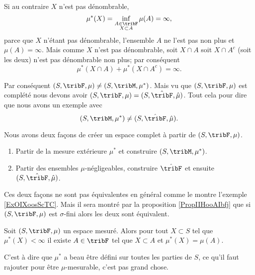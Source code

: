 \begin{example}
\begin{subproof}
        Si au contraire \( X\) n'est pas dénombrable,
        \begin{equation}
            \mu^*(X)=\inf_{\substack{A\in\tribF\\X\subset A}}\mu(A)=\infty,
        \end{equation}
         parce que \( X\) n'étant pas dénombrable, l'ensemble \( A\) ne l'est pas non plus et \( \mu(A)=\infty\). Mais comme \( X\) n'est pas dénombrable, soit \( X\cap A\) soit \( X\cap A^c\) (soit les deux) n'est pas dénombrable non plus; par conséquent
         \begin{equation}
             \mu^*(X\cap A)+\mu^*(X\cap A^c)=\infty.
         \end{equation}
    \end{subproof}

    Par conséquent \( (S,\tribF,\mu) \neq (S,\tribM,\mu^*)\). Mais vu que \( (S,\tribF,\mu)\) est complété nous devons avoir \( (S,\tribF,\mu)=(S,\hat\tribF,\hat\mu)\). Tout cela pour dire que nous avons un exemple avec
    \begin{equation}
        (S,\tribM,\mu^*)\neq (S,\hat\tribF,\hat \mu).
    \end{equation}
\end{example}

Nous avons deux façons de créer un espace complet à partir de \( (S,\tribF,\mu)\).
\begin{enumerate}
    \item
        Partir de la mesure extérieure \( \mu^*\) et construire \( (S,\tribM,\mu^*)\).
    \item
        Partir des ensembles \( \mu\)-négligeables, construire \( \hat\tribF\) et ensuite \( (S,\hat\tribF,\hat\mu)\).
\end{enumerate}
Ces deux façons ne sont pas équivalentes en général comme le montre l'exemple \ref{ExOIXoosScTC}. Mais il sera montré par la proposition \ref{PropIIHooAIbfj} que si \( (S,\tribF,\mu)\) est \( \sigma\)-fini alors les deux sont équivalent.

\begin{lemma}   \label{LemAESoofkMpi}
    Soit \( (S,\tribF,\mu)\) un espace mesuré. Alors pour tout \( X\subset S\) tel que \( \mu^*(X)<\infty\) il existe \( A\in\tribF\) tel que \( X\subset A\) et \( \mu^*(X)=\mu(A)\).
\end{lemma}
C'est à dire que \( \mu^*\) a beau être défini sur toutes les parties de \( S\), ce qu'il faut rajouter pour être \( \mu\)-mesurable, c'est pas grand chose.

